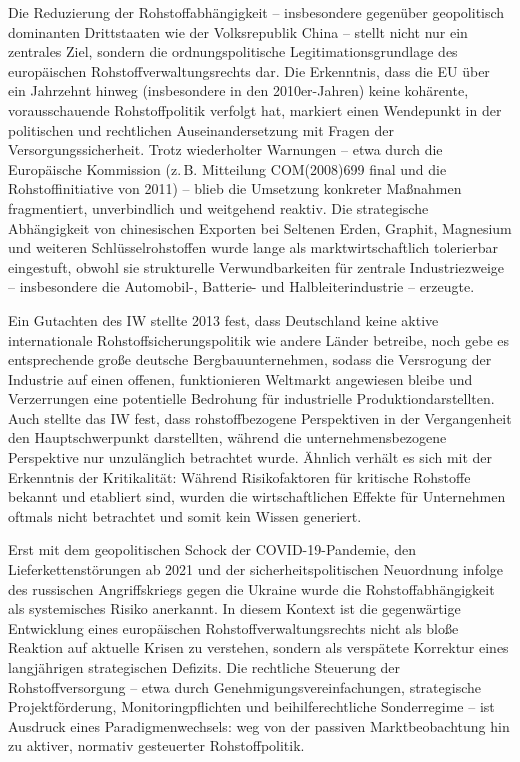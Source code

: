 \documentclass[12pt,a4paper,oneside]{book} %
\begin{document}
Die Reduzierung der Rohstoffabhängigkeit -- insbesondere gegenüber geopolitisch dominanten Drittstaaten wie der Volksrepublik China -- stellt nicht nur ein zentrales Ziel, sondern die ordnungspolitische Legitimationsgrundlage des europäischen Rohstoffverwaltungsrechts dar. Die Erkenntnis, dass die EU über ein Jahrzehnt hinweg (insbesondere in den 2010er-Jahren) keine kohärente, vorausschauende Rohstoffpolitik verfolgt hat, markiert einen Wendepunkt in der politischen und rechtlichen Auseinandersetzung mit Fragen der Versorgungssicherheit. Trotz wiederholter Warnungen – etwa durch die Europäische Kommission (z. B. Mitteilung COM(2008)699 final und die Rohstoffinitiative von 2011) – blieb die Umsetzung konkreter Maßnahmen fragmentiert, unverbindlich und weitgehend reaktiv. Die strategische Abhängigkeit von chinesischen Exporten bei Seltenen Erden, Graphit, Magnesium und weiteren Schlüsselrohstoffen wurde lange als marktwirtschaftlich tolerierbar eingestuft, obwohl sie strukturelle Verwundbarkeiten für zentrale Industriezweige – insbesondere die Automobil-, Batterie- und Halbleiterindustrie – erzeugte.

Ein Gutachten des IW stellte 2013 fest, dass Deutschland keine aktive internationale Rohstoffsicherungspolitik wie andere Länder betreibe, noch gebe es entsprechende große deutsche Bergbauunternehmen, sodass die Versrogung der Industrie auf einen offenen, funktionieren Weltmarkt angewiesen bleibe und Verzerrungen eine \glqq potentielle Bedrohung für industrielle Produktion\grqq darstellten.\autocite{Bericht IW Rohstoffe für die Industrie , 2013, S. 7} Auch stellte das IW fest, dass rohstoffbezogene Perspektiven in der Vergangenheit den Hauptschwerpunkt darstellten, während die unternehmensbezogene Perspektive nur unzulänglich betrachtet wurde.\autocite{IW, Rohstoffe für die Industrie, S. 8} Ähnlich verhält es sich mit der Erkenntnis der Kritikalität: Während Risikofaktoren für kritische Rohstoffe bekannt und etabliert sind, wurden die wirtschaftlichen Effekte für Unternehmen oftmals nicht betrachtet und somit kein Wissen generiert.\autocite{IW, Rohstoffe für die Industrie , S. 11}

Erst mit dem geopolitischen Schock der COVID-19-Pandemie, den Lieferkettenstörungen ab 2021 und der sicherheitspolitischen Neuordnung infolge des russischen Angriffskriegs gegen die Ukraine wurde die Rohstoffabhängigkeit als systemisches Risiko anerkannt. In diesem Kontext ist die gegenwärtige Entwicklung eines europäischen Rohstoffverwaltungsrechts nicht als bloße Reaktion auf aktuelle Krisen zu verstehen, sondern als verspätete Korrektur eines langjährigen strategischen Defizits. Die rechtliche Steuerung der Rohstoffversorgung – etwa durch Genehmigungsvereinfachungen, strategische Projektförderung, Monitoringpflichten und beihilferechtliche Sonderregime – ist Ausdruck eines Paradigmenwechsels: weg von der passiven Marktbeobachtung hin zu aktiver, normativ gesteuerter Rohstoffpolitik.
\end{document}
